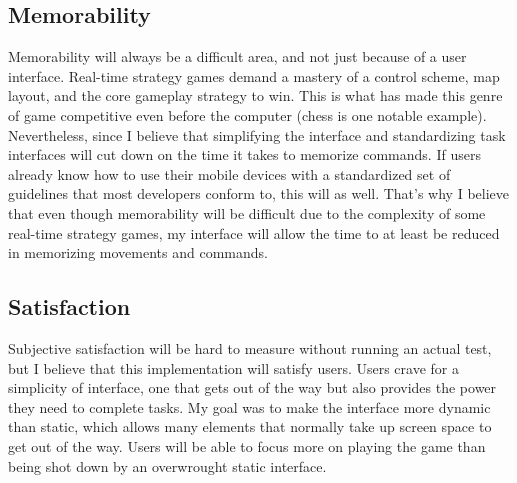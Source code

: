 \documentclass[11pt]{article}
\begin{document}
	\subsection{Memorability}
	Memorability will always be a difficult area, and not just because of a user interface. Real-time strategy games demand a mastery of a control scheme, map layout, and the core gameplay strategy to win. This is what has made this genre of game competitive even before the computer (chess is one notable example). Nevertheless, since I believe that simplifying the interface and standardizing task interfaces will cut down on the time it takes to memorize commands. If users already know how to use their mobile devices with a standardized set of guidelines that most developers conform to, this will as well. That's why I believe that even though memorability will be difficult due to the complexity of some real-time strategy games, my interface will allow the time to at least be reduced in memorizing movements and commands.
	\subsection{Satisfaction}
	Subjective satisfaction will be hard to measure without running an actual test, but I believe that this implementation will satisfy users. Users crave for a simplicity of interface, one that gets out of the way but also provides the power they need to complete tasks. My goal was to make the interface more dynamic than static, which allows many elements that normally take up screen space to get out of the way. Users will be able to focus more on playing the game than being shot down by an overwrought static interface.
\end{document}
